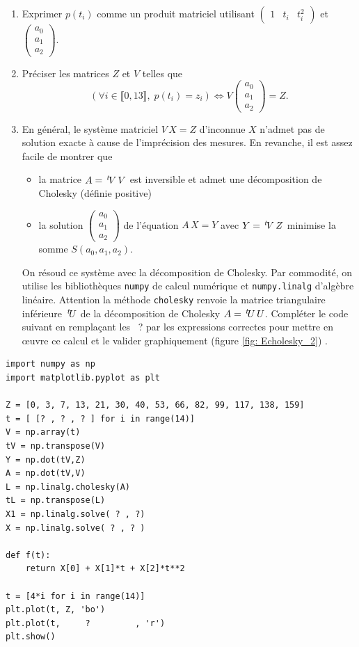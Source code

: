 \begin{enumerate}
 \item Exprimer $p(t_i)$ comme un produit matriciel utilisant $ \begin{pmatrix}
  1 & t_i & t_i^2
 \end{pmatrix}$
 et $ 
\begin{pmatrix}
 a_0 \\ a_1 \\ a_2
\end{pmatrix}
$.
\item Préciser les matrices $Z$ et $V$ telles que
\begin{displaymath}
 \left( \forall i \in\llbracket 0, 13\rrbracket, \; p(t_i) = z_i\right) \Leftrightarrow 
 V \begin{pmatrix}
 a_0 \\ a_1 \\ a_2
\end{pmatrix}
= Z.
\end{displaymath}
\item En général, le système matriciel $V\,X = Z$ d'inconnue $X$ n'admet pas de solution exacte à cause de l'imprécision des mesures. En revanche, il est assez facile de montrer que 
\begin{itemize}
 \item la matrice $A = \,\mathstrut^t\! V \, V$ est inversible et admet une décomposition de Cholesky (définie positive)
 \item la solution $ 
\begin{pmatrix}
 a_0 \\ a_1 \\ a_2
\end{pmatrix}
$ de l'équation $A\,X = Y$ avec $Y = \,\mathstrut^t\! V\,Z$ minimise la somme $S(a_0,a_1,a_2)$.
\end{itemize}
On résoud ce système avec la décomposition de Cholesky. Par commodité, on utilise les bibliothèques \texttt{numpy} de calcul numérique et \texttt{numpy.linalg} d'algèbre linéaire. Attention la méthode \texttt{cholesky} renvoie la matrice triangulaire inférieure $\,\mathstrut^t\! U$ de la décomposition de Cholesky $A = \,\mathstrut^t\! U\, U$.\newline
Compléter le code suivant en remplaçant les ~? par les expressions correctes pour mettre en \oe{}uvre ce calcul et le valider graphiquement (figure \ref{fig: Echolesky_2}) .
\end{enumerate}
\begin{verbatim}
import numpy as np
import matplotlib.pyplot as plt

Z = [0, 3, 7, 13, 21, 30, 40, 53, 66, 82, 99, 117, 138, 159]
t = [ [? , ? , ? ] for i in range(14)]
V = np.array(t)
tV = np.transpose(V)
Y = np.dot(tV,Z)
A = np.dot(tV,V)
L = np.linalg.cholesky(A) 
tL = np.transpose(L)
X1 = np.linalg.solve( ? , ?)
X = np.linalg.solve( ? , ? )

def f(t):
    return X[0] + X[1]*t + X[2]*t**2

t = [4*i for i in range(14)]
plt.plot(t, Z, 'bo')
plt.plot(t,     ?         , 'r')
plt.show()
\end{verbatim}
